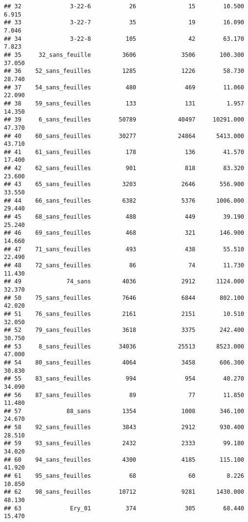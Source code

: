 \documentclass[]{article}
\begin{document}
\begin{verbatim}
## 32              3-22-6           26               15        10.500       6.915
## 33              3-22-7           35               19        16.090       7.046
## 34              3-22-8          105               42        63.170       7.823
## 35     32_sans_feuille         3606             3506       100.300      37.050
## 36    52_sans_feuilles         1285             1226        58.730      28.740
## 37    54_sans_feuilles          480              469        11.060      22.090
## 38    59_sans_feuilles          133              131         1.957      14.350
## 39     6_sans_feuilles        50789            40497     10291.000      47.370
## 40    60_sans_feuilles        30277            24864      5413.000      43.710
## 41    61_sans_feuilles          178              136        41.570      17.400
## 42    62_sans_feuilles          901              818        83.320      23.600
## 43    65_sans_feuilles         3203             2646       556.900      33.550
## 44    66_sans_feuilles         6382             5376      1006.000      29.440
## 45    68_sans_feuilles          488              449        39.190      25.240
## 46    69_sans_feuilles          468              321       146.900      14.660
## 47    71_sans_feuilles          493              438        55.510      22.490
## 48    72_sans_feuilles           86               74        11.730      11.430
## 49             74_sans         4036             2912      1124.000      32.370
## 50    75_sans_feuilles         7646             6844       802.100      42.020
## 51    76_sans_feuilles         2161             2151        10.510      32.050
## 52    79_sans_feuilles         3618             3375       242.400      30.750
## 53     8_sans_feuilles        34036            25513      8523.000      47.000
## 54    80_sans_feuilles         4064             3458       606.300      30.830
## 55    83_sans_feuilles          994              954        40.270      34.090
## 56    87_sans_feuilles           89               77        11.850      11.480
## 57             88_sans         1354             1008       346.100      24.670
## 58    92_sans_feuilles         3843             2912       930.400      28.510
## 59    93_sans_feuilles         2432             2333        99.180      34.020
## 60    94_sans_feuilles         4300             4185       115.100      41.920
## 61    95_sans_feuilles           68               60         8.226      10.850
## 62    98_sans_feuilles        10712             9281      1430.000      48.130
## 63              Ery_01          374              305        68.440      15.470

\end{verbatim}
\end{document}
